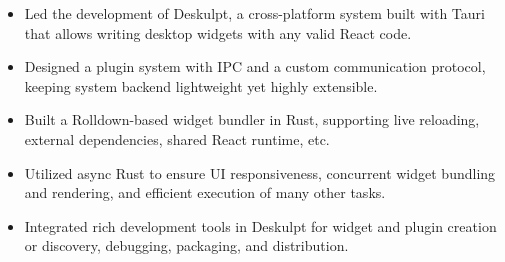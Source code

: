 


\begin{itemize}[nosep]
  \item Led the development of Deskulpt, a cross-platform system built with Tauri that allows writing desktop widgets with any valid React code.
  \item Designed a plugin system with IPC and a custom communication protocol, keeping system backend lightweight yet highly extensible.
  \item Built a Rolldown-based widget bundler in Rust, supporting live reloading, external dependencies, shared React runtime, etc.
  \item Utilized async Rust to ensure UI responsiveness, concurrent widget bundling and rendering, and efficient execution of many other tasks.
  \item Integrated rich development tools in Deskulpt for widget and plugin creation or discovery, debugging, packaging, and distribution.
\end{itemize}
